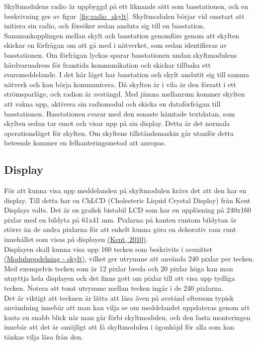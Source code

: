 \documentclass[a4paper,11pt]{article}
\begin{document}
Skyltmodulens radio är uppbyggd på ett liknande sätt som basstationen, och en beskrivning ges av figur~\ref{fig:radio_skylt}. Skyltmodulen börjar vid omstart att initiera sin radio, och försöker sedan ansluta sig till en basstation. Sammankopplingen mellan skylt och basstation genomförs genom att skylten skickar en förfrågan om att gå med i nätverket, som sedan identifieras av basstationen. Om förfrågan lyckas sparar basstationen undan skyltmodulens hårdvaruadress för framtida kommunikation och skickar tillbaka ett svarsmeddelande. I det här läget har basstation och skylt anslutit sig till samma nätverk och kan börja kommunicera. Då skylten är i vila är den försatt i ett strömsparläge, och radion är avstängd. Med jämna mellanrum kommer skylten att vakna upp, aktivera sin radiomodul och skicka en dataförfrågan till basstationen. Basstationen svarar med den senaste hämtade textdatan, som skylten sedan tar emot och visar upp på sin display. Detta är det normala operationsläget för skylten. Om skyltens tillståndsmaskin går utanför detta beteende kommer en felhanteringsmetod att anropas. 

\subsection{Display}
För att kunna visa upp meddelanden på skyltmodulen krävs det att den har en display. Till detta har en ChLCD (Cholesteric Liquid Crystal Display) från Kent Displays valts. Det är en grafisk bistabil LCD som har en upplösning på 240x160 pixlar med en bildyta på 61x41 mm. Pixlarna på kanten runtom bildytan är större än de andra pixlarna för att enkelt kunna göra en dekorativ ram runt innehållet som visas på displayen \hyperref[kent]{(Kent, 2010)}.\\

Displayen skall kunna visa upp 160 tecken som beskrivits i avsnittet \hyperref[skylt]{(Moduluppdelning - skylt)}, vilket ger utrymme att använda 240 pixlar per tecken. Med exempelvis tecken som är 12 pixlar breda och 20 pixlar höga kan man utnyttja hela displayen och det finns gott om pixlar till att visa upp tydliga tecken. Notera att tomt utrymme mellan tecken ingår i de 240 pixlarna.\\

Det är viktigt att tecknen är lätta att läsa även på avstånd eftersom typisk användning innebär att man kan vilja se om meddelandet uppdateras genom att kasta en snabb blick när man går förbi skyltmodulen, och den fasta monteringen innebär att det är omöjligt att få skyltmodulen i ögonhöjd för alla som kan tänkas vilja läsa från den.
\end{document}
